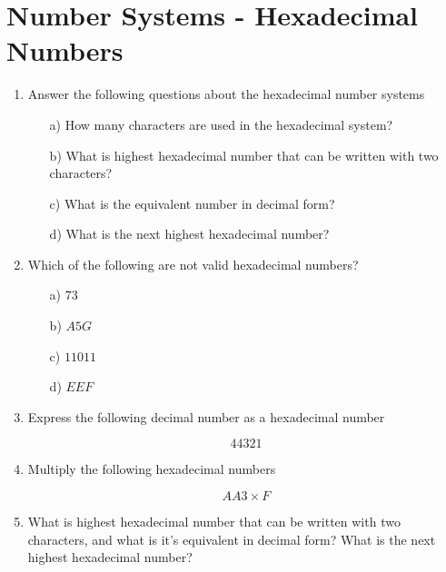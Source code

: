 \documentclass[]{article}
\author{www.MathsResource.Github.io}
\begin{document}
\section*{Number Systems - Hexadecimal Numbers}

\begin{enumerate}
	

	\item Answer the following questions about the hexadecimal number systems
	\begin{itemize}
		\item[a)] How many characters are used in the hexadecimal system?
		\item[b)] What is highest hexadecimal number that can be written with two characters? \item[c)] What is the equivalent number in decimal form?
		\item[d)] What is the next highest hexadecimal number?
	\end{itemize}
	
	
	\item Which of the following are not valid hexadecimal numbers?
	\begin{multicols}{4}
		\begin{itemize}
			\item[a)] $73$
			\item[b)] $A5G$
			\item[c)] $11011$
			\item[d)] $EEF	$
		\end{itemize}
	\end{multicols}

\item Express the following decimal number as a hexadecimal number

\[44321\]



\item Multiply the following hexadecimal numbers

\[AA3 \times F\]




\item What is highest hexadecimal number that can be written with two characters, and what is it's equivalent in decimal form?
What is the next highest hexadecimal number?



\end{enumerate}
\end{document}
